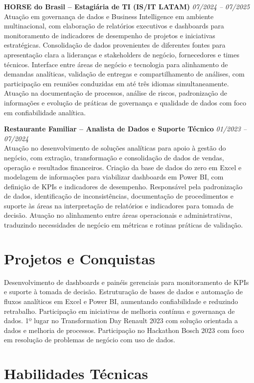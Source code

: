 \documentclass[11pt,a4paper]{article}
\newcommand{\experience}[3]{%
  \textbf{#1} \hfill \textit{#2}\\[4pt]
  #3
  \vspace{8pt}
}
\begin{document}
\experience{HORSE do Brasil -- Estagiária de TI (IS/IT LATAM)}{07/2024 -- 07/2025}{%
Atuação em governança de dados e Business Intelligence em ambiente multinacional, com elaboração de relatórios executivos e dashboards para monitoramento de indicadores de desempenho de projetos e iniciativas estratégicas. Consolidação de dados provenientes de diferentes fontes para apresentação clara a lideranças e stakeholders de negócio, fornecedores e times técnicos. Interface entre áreas de negócio e tecnologia para alinhamento de demandas analíticas, validação de entregas e compartilhamento de análises, com participação em reuniões conduzidas em até três idiomas simultaneamente. Atuação na documentação de processos, análise de riscos, padronização de informações e evolução de práticas de governança e qualidade de dados com foco em confiabilidade analítica.}

\experience{Restaurante Familiar -- Analista de Dados e Suporte Técnico}{01/2023 -- 07/2024}{%
Atuação no desenvolvimento de soluções analíticas para apoio à gestão do negócio, com extração, transformação e consolidação de dados de vendas, operação e resultados financeiros. Criação da base de dados do zero em Excel e modelagem de informações para viabilizar dashboards em Power BI, com definição de KPIs e indicadores de desempenho. Responsável pela padronização de dados, identificação de inconsistências, documentação de procedimentos e suporte às áreas na interpretação de relatórios e indicadores para tomada de decisão. Atuação no alinhamento entre áreas operacionais e administrativas, traduzindo necessidades de negócio em métricas e rotinas práticas de validação.}

\section*{Projetos e Conquistas}

Desenvolvimento de dashboards e painéis gerenciais para monitoramento de KPIs e suporte à tomada de decisão. Estruturação de bases de dados e automação de fluxos analíticos em Excel e Power BI, aumentando confiabilidade e reduzindo retrabalho. Participação em iniciativas de melhoria contínua e governança de dados. 1º lugar no Transformation Day Renault 2023 com solução orientada a dados e melhoria de processos. Participação no Hackathon Bosch 2023 com foco em resolução de problemas de negócio com uso de dados.

\section*{Habilidades Técnicas}
\end{document}
